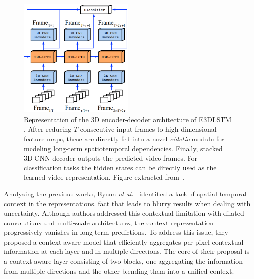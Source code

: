 \begin{figure}[!tbp]
	\centering
	\includegraphics[width=0.5\textwidth]{figures/videoprediction/methods/e3d_lstm.png}
	\caption{Representation of the 3D encoder-decoder architecture of \ac{E3DLSTM} \cite{Wang2019b}. After reducing $T$ consecutive input frames to high-dimensional feature maps, these are directly fed into a novel \textit{eidetic} module for modeling long-term spatiotemporal dependencies. Finally, stacked 3D \ac{CNN} decoder outputs the predicted video frames. For classification tasks the hidden states can be directly used as the learned video representation. Figure extracted from~\cite{Wang2019b}.}
	\label{fig:e3d_lstm}
\end{figure}

Analyzing the previous works, Byeon \textit{et al.}~\cite{Byeon2018} identified a lack of spatial-temporal context in the representations, fact that leads to blurry results when dealing with uncertainty. Although authors addressed this contextual limitation with dilated convolutions and multi-scale architectures, the context representation progressively vanishes in long-term predictions. To address this issue, they proposed a context-aware model that efficiently aggregates per-pixel contextual information at each layer and in multiple directions. The core of their proposal is a context-aware layer consisting of two blocks, one aggregating the information from multiple directions and the other blending them into a unified context.

